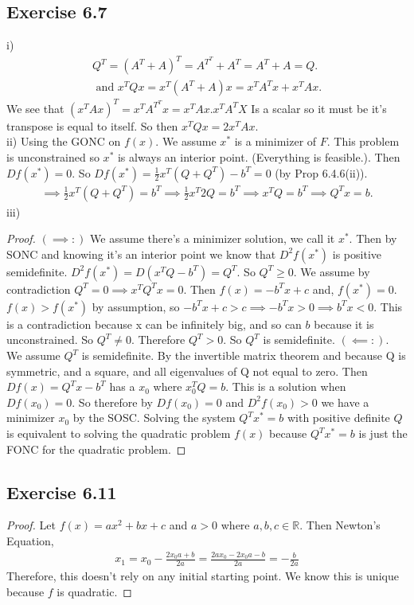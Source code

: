 \documentclass[11.5pt, letterpaper, bibtotoc,
    tablecaptionabove, figurecaptionabove]{article}
\begin{document}
\subsection*{Exercise 6.7}
i) 
\begin{align*}
	Q^T = (A^T + A)^T = A^{T^T} + A^T = A^T + A = Q. \\
	\text{ and } x^TQx = x^T(A^T + A)x = x^TA^Tx + x^TAx.
\end{align*}
We see that $(x^TAx)^T = x^TA^{T^T}x = x^TAx.  x^TA^TX$ Is a scalar so it must be it's transpose is equal to itself.  So then $x^TQx = 2x^TAx$.  \\
ii)
Using the GONC on $f(x).$  We assume $x^*$ is a minimizer of $F$.  This problem is unconstrained so $x^*$ is always an interior point.  (Everything is feasible.). Then $Df(x^*) = 0.$  So $Df(x^*) = \frac{1}{2}x^T(Q + Q^T) - b^T = 0$ (by Prop 6.4.6(ii)).
\begin{align*}
	\implies \frac{1}{2}x^T(Q + Q^T) = b^T \implies \frac{1}{2} x^T 2Q = b^T \implies x^TQ = b^T \implies Q^Tx=b.
\end{align*}
iii)
\begin{proof}
$(\implies :)$ We assume there's a minimizer solution, we call it $x^*$.  Then by SONC and knowing it's an interior point we know that $D^2f(x^*)$ is positive semidefinite.  $D^2f(x^*) = D(x^TQ - b^T) = Q^T.$ So $Q^T \geq 0$.  We assume by contradiction $Q^T = 0 \implies x^TQ^Tx = 0$.  Then $f(x) = -b^Tx + c$ and, $f(x^*) = 0$.  $f(x) > f(x^*)$ by assumption, so $-b^Tx + c > c \implies -b^Tx > 0 \implies b^Tx < 0$.  This is a contradiction because x can be infinitely big, and so can $b$ because it is unconstrained.  So $Q^T \neq 0$.  Therefore $Q^T > 0$.  So $Q^T$ is semidefinite.
$(\impliedby :)$. We assume $Q^T$ is semidefinite.  By the invertible matrix theorem and because Q is symmetric, and a square, and all eigenvalues of Q not equal to zero.  Then $Df(x) = Q^Tx - b^T$ has a $x_0$ where $x_0^TQ = b$.  This is a solution when $Df(x_0) = 0$.  So therefore by $Df(x_0) = 0$ and $D^2f(x_0) > 0$ we have a minimizer $x_0$ by the SOSC.  
Solving the system $Q^Tx^* = b$ with positive definite $Q$ is equivalent to solving the quadratic problem $f(x)$ because $Q^Tx^* = b$ is just the FONC for the quadratic problem. 
\end{proof}

\subsection*{Exercise 6.11}
\begin{proof}
Let $f(x) = ax^2 +bx +c$ and $a>0$ where $a,b,c \in \mathbb{R}$.  Then Newton's Equation,
\begin{align*}
	x_1 = x_0 - \frac{2x_0a + b}{2a} = \frac{2ax_0 - 2x_0a -b}{2a} = -\frac{b}{2a}
\end{align*}
Therefore, this doesn't rely on any initial starting point.  We know this is unique because $f$ is quadratic.  
\end{proof}
\end{document}
